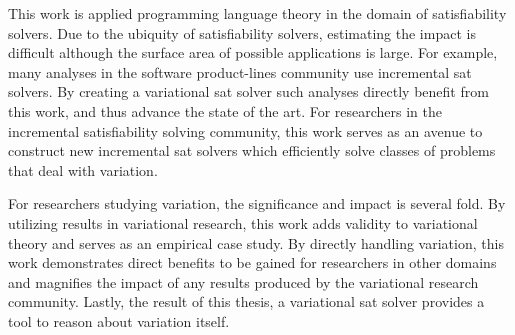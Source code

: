 This work is applied programming language theory in the domain of satisfiability
solvers. Due to the ubiquity of satisfiability solvers, estimating the impact is
difficult although the surface area of possible applications is large. For
example, many analyses in the software product-lines community use incremental
\ac{sat} solvers. By creating a variational \ac{sat} solver such analyses
directly benefit from this work, and thus advance the state of the art. For
researchers in the incremental satisfiability solving community, this work
serves as an avenue to construct new incremental \ac{sat} solvers which
efficiently solve classes of problems that deal with variation.

For researchers studying variation, the significance and impact is several fold.
By utilizing results in variational research, this work adds validity to
variational theory and serves as an empirical case study. By directly handling
variation, this work demonstrates direct benefits to be gained for researchers
in other domains and magnifies the impact of any results produced by the
variational research community. Lastly, the result of this thesis, a variational
\ac{sat} solver provides a tool to reason about variation itself.

